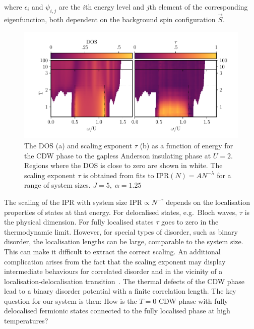 where \(\epsilon_i\) and \(\psi_{i,j}\) are the \(i\)th energy level and \(j\)th element of the corresponding eigenfunction, both dependent on the background spin configuration \(\vec{S}\).

\hypertarget{fig:gap_opening_U2}{%
\begin{figure}
\centering
\includegraphics[width=1\textwidth,height=\textheight]{figure_code/fk_chapter/gap_opening/gap_opening_U2}
\caption[{The transition from CDW to the Anderson Phase}]{The DOS (a) and scaling exponent \(\tau\) (b) as a function of energy for the CDW phase to the gapless Anderson insulating phase at \(U=2\). Regions where the DOS is close to zero are shown in white. The scaling exponent \(\tau\) is obtained from fits to \(\mathrm{IPR}(N) = A N^{-\lambda}\) for a range of system sizes. \(J = 5,\;\alpha = 1.25\)}
\label{fig:gap_opening_U2}
\end{figure}
}

The scaling of the IPR with system size \(\mathrm{IPR} \propto N^{-\tau}\) depends on the localisation properties of states at that energy. For delocalised states, e.g.~Bloch waves, \(\tau\) is the physical dimension. For fully localised states \(\tau\) goes to zero in the thermodynamic limit. However, for special types of disorder, such as binary disorder, the localisation lengths can be large, comparable to the system size. This can make it difficult to extract the correct scaling. An additional complication arises from the fact that the scaling exponent may display intermediate behaviours for correlated disorder and in the vicinity of a localisation-delocalisation transition~\autocite{kramerLocalizationTheoryExperiment1993,eversAndersonTransitions2008}. The thermal defects of the CDW phase lead to a binary disorder potential with a finite correlation length. The key question for our system is then: How is the \(T=0\) CDW phase with fully delocalised fermionic states connected to the fully localised phase at high temperatures?

